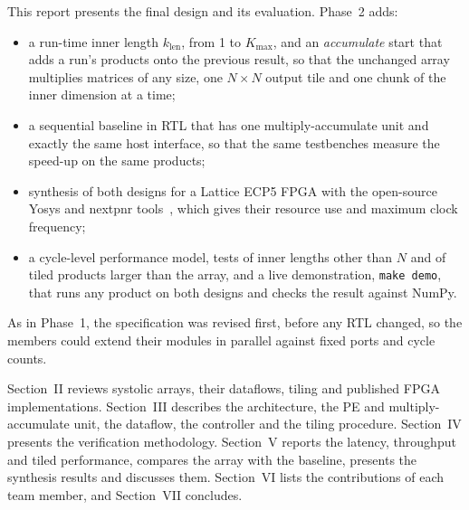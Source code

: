 This report presents the final design and its evaluation. Phase~2 adds:
\begin{itemize}
\item a run-time inner length $k_{\mathrm{len}}$, from 1 to $K_{\max}$, and an \emph{accumulate} start that adds a run's products onto the previous result, so that the unchanged array multiplies matrices of any size, one $N \times N$ output tile and one chunk of the inner dimension at a time;
\item a sequential baseline in RTL that has one multiply-accumulate unit and exactly the same host interface, so that the same testbenches measure the speed-up on the same products;
\item synthesis of both designs for a Lattice ECP5 FPGA with the open-source Yosys and nextpnr tools~\cite{wolf2013yosys, shah2019yosysnextpnr}, which gives their resource use and maximum clock frequency;
\item a cycle-level performance model, tests of inner lengths other than $N$ and of tiled products larger than the array, and a live demonstration, \texttt{make demo}, that runs any product on both designs and checks the result against NumPy.
\end{itemize}
As in Phase~1, the specification was revised first, before any RTL changed, so the members could extend their modules in parallel against fixed ports and cycle counts.

Section~II reviews systolic arrays, their dataflows, tiling and published FPGA implementations. Section~III describes the architecture, the PE and multiply-accumulate unit, the dataflow, the controller and the tiling procedure. Section~IV presents the verification methodology. Section~V reports the latency, throughput and tiled performance, compares the array with the baseline, presents the synthesis results and discusses them. Section~VI lists the contributions of each team member, and Section~VII concludes.
